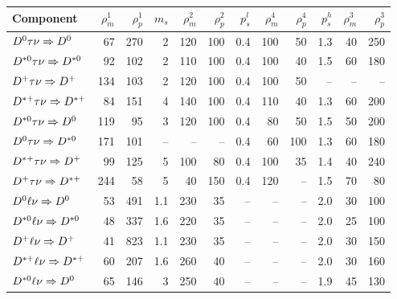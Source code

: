 \documentclass[6pt]{article}
\begin{document}
\begin{tabular}{l r r r r r r r r r r r}\hline\hline
Component & $\rho_m^1$ & $\rho_p^1$ & $m_s$ & $\rho_m^2$ & $\rho_p^2$ & $p_s^l$ & $\rho_m^4$ & $\rho_p^4$ & $p_s^h$ & $\rho_m^3$ & $\rho_p^3$  \\ \hline 
$D^0\tau\nu\Rightarrow D^0                     $   &    67    &  270   &  2     &  120 &  100  &  0.4    &  100  &  50   &  1.3    & 40  & 250  \\ 
$D^{*0}\tau\nu\Rightarrow D^{*0}             $   &    92    &  102   &  2     &  110 &  100  &  0.4    &  100  &  40   &  1.5    & 60  & 180  \\ 
$D^+\tau\nu\Rightarrow D^+                     $   &    134   &  103   &  2     &  120 &  100  &  0.4    &  100  &  50   &  --   & --  & --   \\ 
$D^{*+}\tau\nu\Rightarrow D^{*+}             $   &    84    &  151   &  4     &  140 &  100  &  0.4    &  110  &  40   &  1.3    & 60  & 200  \\ 
$D^{*0}\tau\nu\Rightarrow D^0                 $   &    119   &  95    &  3     &  120 &  100  &  0.4    &  80   & 50    &  1.5    & 50  & 200  \\ 
$D^0\tau\nu\Rightarrow D^{*0}                 $   &    171   &  101   &  --    &  -- &  --  &  0.4    &  60   & 100   &  1.3    & 60  & 180  \\ 
$D^{*+}\tau\nu\Rightarrow D^+                 $   &    99    &  125   &  5     &  100 &  80   &   0.4   &  100  &  35   &  1.4    & 40  & 240  \\ 
$D^+\tau\nu\Rightarrow D^{*+}                 $   &    244   &  58    &  5     &  40  & 150   &   0.4   &  120  & --    &  1.5    & 70  & 80   \\ 
$D^0\ell\nu\Rightarrow D^0                     $   &    53    &  491   &  1.1   &  230 &   35  &  --   &  --   & --    &  2.0    & 30  & 100  \\ 
$D^{*0}\ell\nu\Rightarrow D^{*0}             $   &    48    &  337   &  1.6   &  220 &   35  &  --   &  --   & --    &  2.0    & 25  & 100  \\ 
$D^+\ell\nu\Rightarrow D^+                     $   &    41    &  823   &  1.1   &  230 &   35  &  --   &  --   & --    &  2.0    & 30  & 150  \\ 
$D^{*+}\ell\nu\Rightarrow D^{*+}             $   &    60    &  207   &  1.6   &  260 &   40  &  --   &  --   & --    &  2.0    & 30  & 160  \\ 
$D^{*0}\ell\nu\Rightarrow D^0                 $   &    65    &  146   &  3     &  250 &   40  &  --   &  --   & --    &  1.9    & 45  & 130  \\ 

\end{tabular}
\end{document}
